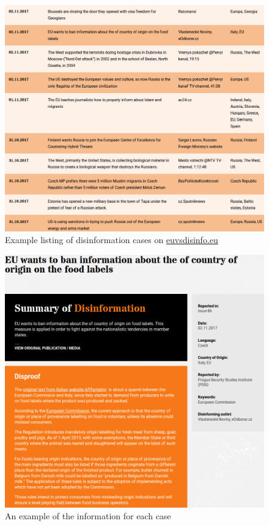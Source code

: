 \documentclass{article}
\begin{document}
\begin{figure}[H]
    \centering
    \caption{Example listing of disinformation cases on \url{euvsdisinfo.eu}}
    \label{fig:cases}
    \includegraphics[width=.9\textwidth]{images/example_cases.png}
\end{figure}
\begin{figure}[H]
    \centering
    \caption{An example of the information for each case}
    \label{fig:single_case}
    \includegraphics[width=.9\textwidth]{images/example_fakenews.png}
\end{figure}
\end{document}
